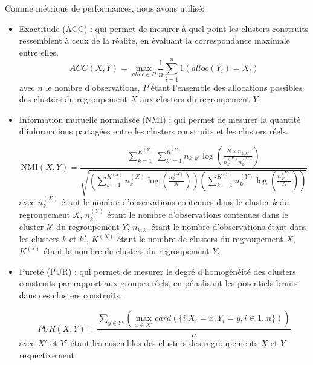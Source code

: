  	Comme métrique de performances, nous avons utilisé:
	\begin{itemize}
  	  \item Exactitude (ACC) : qui permet de mesurer à quel point les clusters construits ressemblent à ceux de la réalité, en évaluant la correspondance maximale entre elles.
  	  \begin{equation}
  		  ACC(X,Y) = \max_{alloc \in P} \frac{1}{n} \sum_{i=1}^{n} 1(alloc(Y_i) = X_i)
  	  \end{equation}
  	  avec $n$ le nombre d'observations, $P$ étant l'ensemble des allocations possibles des clusters  du regroupement $X$ aux clusters du regroupement $Y$.
      
  	  \item Information mutuelle normalisée (\acrshort{NMI}) : qui permet de mesurer la quantité d'informations partagées entre les clusters construits et les clusters réels.

  	  \begin{equation}
     	   \text{NMI}(X,Y) = \frac{ \sum_{k=1}^{K^{(X)}} \sum_{k'=1}^{K^{(Y)}} n_{k,k'} \log\left( \frac{N \times n_{k,k'}}{ n_k^{(X)} n_{k'}^{(Y)} } \right) }{  \sqrt{ \left( \sum_{k=1}^{K^{(X)}} n_k^{(X)}\log( \frac{n_k^{(X)}}{N} )  \right) \left( \sum_{k'=1}^{K^{(Y)}} n_{k'}^{(Y)} \log( \frac{n_{k'}^{(Y)}}{N} )  \right)  } }
		   	\label{equa:enss2}
  	  \end{equation}
  	  avec $n_k^{(X)}$ étant le nombre d'observations contenues dans le cluster $k$ du regroupement $X$, $n_{k'}^{(Y)}$ étant le nombre d'observations contenues dans le cluster $k'$ du regroupement $Y$, $n_{k,k'}$ étant le nombre d'observations étant dans les clusters $k$ et $k'$, $K^{(X)}$ étant le nombre de clusters du regroupement $X$, $K^{(Y)}$ étant le nombre de clusters du regroupement $Y$.
      
  	  \item Pureté (PUR) : qui permet de mesurer le degré d'homogénéité des clusters construits par rapport aux groupes réels, en pénalisant les potentiels bruits dans ces clusters construits.

  	  \begin{equation}
  		  PUR(X,Y) = \frac{ \sum_{ y \in Y'} \left( \max_{x \in X'} card(\{ i| X_i = x, Y_i = y, i \in 1..n \})\right)}{n}
  	  \end{equation}
  	  avec $X'$ et $Y'$ étant les ensembles des clusters des regroupements $X$ et $Y$ respectivement
	\end{itemize}

